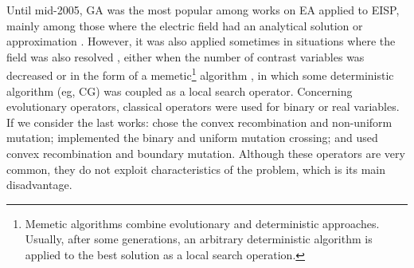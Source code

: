 			Until mid-2005, GA was the most popular among works on EA applied to EISP, mainly among those where the electric field had an analytical solution or approximation \citep{kent1997dielectric,qing2001electromagnetic,caorsi2000two}.  However, it was also applied sometimes in situations where the field was also resolved \citep{pastorino2000microwave}, either when the number of contrast variables was decreased \citep{benedetti2007multicrack} or in the form of a memetic\footnote{Memetic algorithms combine evolutionary and deterministic approaches. Usually, after some generations, an arbitrary deterministic algorithm is applied to the best solution as a local search operation.} algorithm \citep{caorsi2003detection,caorsi2003electromagnetic,pastorino2004reconstruction,massa2005parallel}, in which some deterministic algorithm (eg, CG) was coupled as a local search operator. Concerning evolutionary operators, classical operators were used for binary or real variables. If we consider the last works: \citep{massa2005parallel} chose the convex recombination and non-uniform mutation; \cite{benedetti2007multicrack} implemented the binary and uniform mutation crossing; and \cite{noghanian2014microwave} used convex recombination and boundary mutation. Although these operators are very common, they do not exploit characteristics of the problem, which is its main disadvantage.
			

